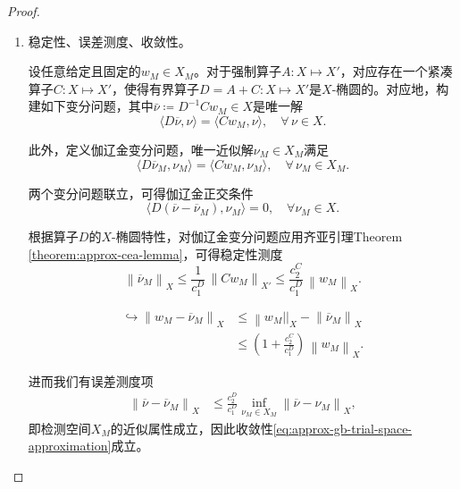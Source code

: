 \begin{proof}

\begin{enumerate}

\item
稳定性、误差测度、收敛性。

设任意给定且固定的$w_{M} \in X_{M}$。对于强制算子$A:X \mapsto X'$，对应存在一个紧凑算子$C:X \mapsto X'$，使得有界算子$D=A+C:X \mapsto X'$是$X$-椭圆的。对应地，构建如下变分问题，其中$\bar{\nu} \coloneqq D^{-1} C w_{M} \in X$是唯一解
\begin{equation*}
  \langle D \overline{\nu}, \nu \rangle = \langle C w_{M}, \nu \rangle, \quad \forall \, \nu \in X.
\end{equation*}

此外，定义伽辽金变分问题，唯一近似解$\nu_{M} \in X_{M}$满足
\begin{equation*}
  \langle D \overline{\nu}_{M}, \nu_{M} \rangle = \langle C w_{M}, \nu_{M} \rangle, \quad \forall \, \nu_{M} \in X_{M}.
\end{equation*}

两个变分问题联立，可得伽辽金正交条件
\begin{equation*}
  \langle D \left( \overline{\nu} - \overline{\nu}_{M} \right), \nu_{M} \rangle
  = 0, \quad \forall \nu_{M} \in X.
\end{equation*}

根据算子$D$的$X$-椭圆特性，对伽辽金变分问题应用齐亚引理Theorem \ref{theorem:approx-cea-lemma}，可得稳定性测度
\begin{equation*}
  \left\| \overline{\nu}_{M} \right\|_{X}
  \le \frac{1}{c_{1}^{D}} \, \left\| C w_{M} \right\|_{X'}
  \le \frac{c_{2}^{C}}{c_{1}^{D}} \, \left\| w_{M} \right\|_{X}.
\end{equation*}

\begin{equation*}
  \begin{split}
    \hookrightarrow \left\|w_{M} - \overline{\nu}_{M} \right\|_{X}
    & \le \left\| w_{M} \right||_{X} - \left\| \overline{\nu}_{M} \right\|_{X} \\
    & \le \left( 1 + \frac{c_{2}^{C}}{c_{1}^{D}} \right) \,
    \left\| w_{M} \right\|_{X}.
  \end{split}
\end{equation*}

进而我们有误差测度项
\begin{equation*}
  \begin{split}
    \left\| \overline{\nu} - \overline{\nu}_{M} \right\|_{X}
    & \le \frac{c_{2}^{D}}{c_{1}^{D}} \inf_{\nu_{M} \in X_{M}}
    \left\| \overline{\nu} - \nu_{M} \right\|_{X},
  \end{split}
\end{equation*}
即检测空间$X_{M}$的近似属性成立，因此收敛性\eqref{eq:approx-gb-trial-space-approximation}成立。


\end{enumerate}
\end{proof}
